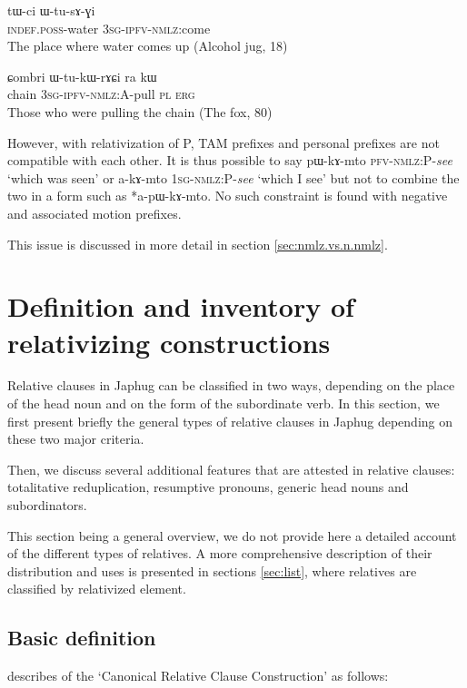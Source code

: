 \documentclass[oldfontcommands,oneside,a4paper,11pt]{article}
\newcommand{\ipa}[1]{{\phon #1}} %
\begin{document}
 \begin{exe}
\ex \label{ex:WtusAGi}
\gll
\ipa{tɯ-ci}  	\ipa{ɯ-tu-sɤ-ɣi}  \\
\textsc{indef.poss}-water \textsc{3sg-ipfv-nmlz}:come \\
\glt  The place where water comes up (Alcohol jug, 18)
 \end{exe}
 \begin{exe}
\ex \label{ex:WtukWrACi}
\gll 
\ipa{ɕombri}  	\ipa{ɯ-tu-kɯ-rɤɕi}  	\ipa{ra}  	\ipa{kɯ}  \\
chain \textsc{3sg-ipfv-nmlz:A}-pull \textsc{pl} \textsc{erg} \\
\glt Those who were pulling the chain (The fox, 80)
 \end{exe}

However, with relativization of P, TAM prefixes and personal prefixes are not compatible with each other. It is thus possible to say \ipa{pɯ-kɤ-mto} \textsc{pfv-nmlz:P}-\textit{see} `which was seen' or \ipa{a-kɤ-mto} \textsc{1sg-nmlz:P}-\textit{see} `which I see' but not to combine the two in a form such as *\ipa{a-pɯ-kɤ-mto}. No such constraint is found with negative and associated motion prefixes. 


This issue is discussed in more detail in section \ref{sec:nmlz.vs.n.nmlz}.
  
\section{Definition and inventory of relativizing constructions}

Relative clauses in Japhug can be classified in two ways, depending on the place of the head noun and on the form of the subordinate verb. In this section, we first present briefly the general types of relative clauses in Japhug depending on these two major criteria. 

Then, we discuss several additional features that are attested in relative clauses: totalitative reduplication, resumptive pronouns, generic head nouns and subordinators.

This section being a general overview, we do not provide here a detailed account of the different types of relatives. A more comprehensive description of their distribution and uses is presented in sections \ref{sec:list}, where relatives are classified by relativized element.

\subsection{Basic definition}
 \citet[314]{dixon10basic2}  describes of the `Canonical Relative Clause Construction' as follows:
 
\end{document}
